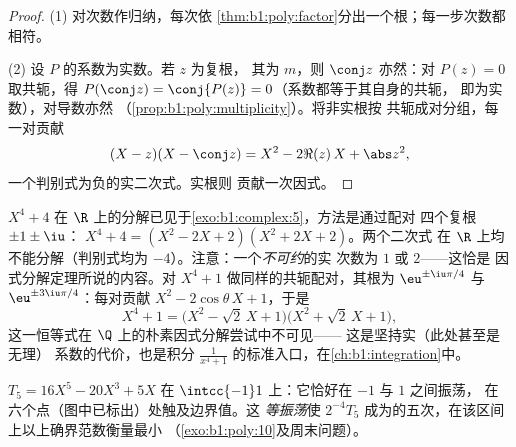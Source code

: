 \begin{proof}
(1) 对次数作归纳，每次依
\cref{thm:b1:poly:factor}分出一个根；每一步次数都相符。

(2) 设 $P$ 的系数为实数。若 $z$ 为复根，
其为 $m$，则 $\conj z$ 亦然：对 $P(z) = 0$ 取共轭，得
$P(\conj z) = \conj{P(z)} = 0$（系数都等于其自身的共轭，
即为实数），对导数亦然
（\cref{prop:b1:poly:multiplicity}）。将非实根按
共轭成对分组，每一对贡献
\[
(X - z)(X - \conj z) = X^2 - 2\Re(z)\, X + \abs z^2 ,
\]
一个判别式为负的实二次式。实根则
贡献一次因式。
\end{proof}

\begin{example}\label{ex:b1:poly:factorexample}
$X^4 + 4$ 在 $\R$ 上的分解已见于\cref{exo:b1:complex:5}，方法是通过配对
四个复根 $\pm 1 \pm \iu$：
$X^4 + 4 = (X^2 - 2X + 2)(X^2 + 2X + 2)$。两个二次式
在 $\R$ 上均不能分解（判别式均为 $-4$）。注意：一个\emph{不可约}的实
次数为 $1$ 或 $2$——这恰是
因式分解定理所说的内容。对
$X^4 + 1$ 做同样的共轭配对，其根为 $\eu^{\pm\iu\pi/4}$ 与
$\eu^{\pm3\iu\pi/4}$：每对贡献 $X^2 -
2\cos\theta\,X + 1$，于是
\[
X^4 + 1 = \bigl(X^2 - \sqrt2\,X + 1\bigr)
\bigl(X^2 + \sqrt2\,X + 1\bigr) ,
\]
这一恒等式在 $\Q$ 上的朴素因式分解尝试中不可见——
这是坚持实（此处甚至是无理）
系数的代价，也是积分 $\frac1{x^4 +
1}$ 的标准入口，在\cref{ch:b1:integration}中。
\end{example}

\begin{omfigure}

{\small {} $T_5 = 16X^5 - 20X^3 + 5X$ 在
$\intcc{-1}1$ 上：它恰好在 $-1$ 与 $1$ 之间振荡，
在六个点（图中已标出）处触及边界值。这
\emph{等振荡}使 $2^{-4}T_5$ 成为的五次，在该区间上以上确界范数衡量最小
（\cref{exo:b1:poly:10}及周末问题）。}
\end{omfigure}

